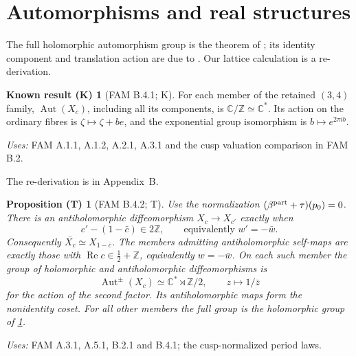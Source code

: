 \documentclass[11pt,a4paper]{article}
\theoremstyle{plain}
\newtheorem{proposition}[theorem]{Proposition (T)}
\theoremstyle{definition}
\newtheorem{cited}[theorem]{Known result (K)}
\begin{document}
\section{Automorphisms and real structures}
\label{sec:real}
The full holomorphic automorphism group is the theorem of
\cite[theorem \texttt{p2:thm:full-automorphisms}]{DGKXv1}; its identity
component and translation action are due to \cite[\S9.7, Proposition~9.23
and Corollary~9.24]{AC26}. Our lattice calculation is a re-derivation.
\begin{cited}[FAM B.4.1; K]\label{fam:B.4.1}
For each member of the retained $(3,4)$ family, $\operatorname{Aut}(X_c)$, including all its components, is $\mathbb C/\mathbb Z\simeq\mathbb C^*$. Its action on the ordinary fibres is $\zeta\mapsto\zeta+be$, and the exponential group isomorphism is $b\mapsto e^{2\pi ib}$.
\end{cited}
\noindent\emph{Uses:} FAM A.1.1, A.1.2, A.2.1, A.3.1 and the cusp valuation comparison in FAM B.2.\par
\noindent The re-derivation is in Appendix~B.\par

\begin{proposition}[FAM B.4.2; T]\label{fam:B.4.2}
Use the normalization $(\beta^{\rm part}+\tau)(p_0)=0$. There is an antiholomorphic diffeomorphism $X_c\to X_{c'}$ exactly when
\[
 c'-(1-\bar c)\in2\mathbb Z,
 \qquad\text{equivalently }w'=-\bar w.
\]
Consequently $\overline{X_c}\simeq X_{1-\bar c}$. The members admitting antiholomorphic self-maps are exactly those with $\operatorname{Re}c\in\tfrac12+\mathbb Z$, equivalently $w=-\bar w$. On each such member the group of holomorphic and antiholomorphic diffeomorphisms is
\[
 \operatorname{Aut}^{\pm}(X_c)\simeq\mathbb C^*\rtimes\mathbb Z/2,
 \qquad z\longmapsto1/\bar z
\]
for the action of the second factor. Its antiholomorphic maps form the nonidentity coset. For all other members the full group is the holomorphic group of \ref{fam:B.4.1}.
\end{proposition}
\noindent\emph{Uses:} FAM A.3.1, A.5.1, B.2.1 and B.4.1; the cusp-normalized period laws.\par
\end{document}
